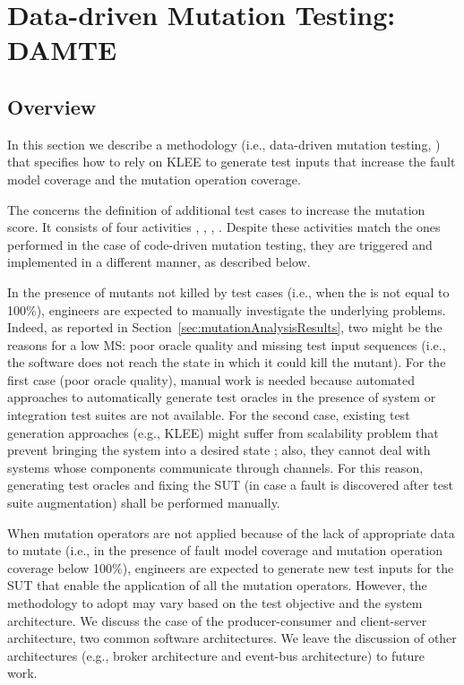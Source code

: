 


\clearpage
\section{Data-driven Mutation Testing: DAMTE} %
\label{sec:data:test_suite_augmentation}

\STARTCHANGEDWPT

\subsection{Overview}

In this section we describe a methodology (i.e., data-driven mutation testing, ) that specifies how to rely on KLEE to generate test inputs that increase the fault model coverage and the mutation operation coverage.

The  concerns the definition of additional test cases to increase the mutation score.
It consists of four activities , , , .
Despite these activities match the ones performed in the case of code-driven mutation testing, they are triggered and implemented in a different manner, as described below.

In the presence of mutants not killed by test cases (i.e., when the   is not equal to 100\%), engineers are expected to manually investigate the underlying problems. Indeed, as reported in Section~\ref{sec:mutationAnalysisResults}, two might be the reasons for a low MS: poor oracle quality and missing test input sequences (i.e., the software does not reach the state in which it could kill the mutant).
For the first case (poor oracle quality), manual work is needed because automated approaches to automatically generate test oracles in the presence of system or integration test suites are not available. For the second case, existing test generation approaches (e.g., KLEE) might suffer from scalability problem that prevent bringing the system into a desired state ; also, they cannot deal with systems whose components communicate through channels. For this reason, generating test oracles and fixing the SUT (in case a fault is discovered after test suite augmentation) shall be performed manually.

When mutation operators are not applied because of the lack of appropriate data to mutate (i.e., in the presence of fault model coverage and mutation operation coverage below 100\%), engineers are expected to generate new test inputs for the SUT that enable the application of all the mutation operators.
However, the methodology to adopt may vary based on the test objective and the system architecture.
We discuss the case of the producer-consumer and client-server architecture, two common software architectures. We leave the discussion of other architectures (e.g., broker architecture and event-bus architecture) to future work.

